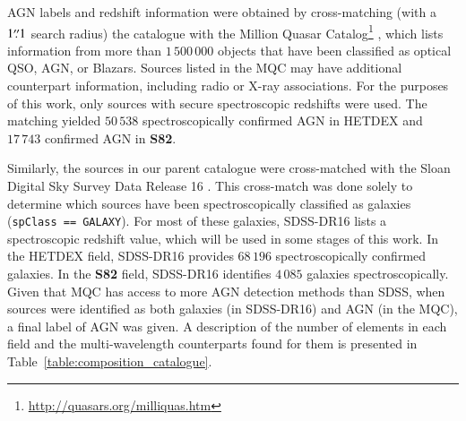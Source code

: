 \documentclass{aa}
\begin{document}
AGN labels and redshift information were obtained by cross-matching (with a $1\overset{\prime\prime}{.} 1$ search radius) the catalogue with the Million Quasar Catalog\footnote{\url{http://quasars.org/milliquas.htm}} \citep[MQC, v7.4d;][]{2021arXiv210512985F}, which lists information from more than $1\,500\,000$ objects that have been classified as optical QSO, AGN, or Blazars. Sources listed in the MQC may have additional counterpart information, including radio or X-ray associations. For the purposes of this work, only sources with secure spectroscopic redshifts were used. The matching yielded $50\,538$ spectroscopically confirmed AGN in HETDEX and $17\,743$ confirmed AGN in \textbf{S82}.

Similarly, the sources in our parent catalogue were cross-matched with the Sloan Digital Sky Survey Data Release 16 \citep[SDSS-DR16;][]{2020ApJS..249....3A}. This cross-match was done solely to determine which sources have been spectroscopically classified as galaxies (\verb|spClass == GALAXY|). 
For most of these galaxies, SDSS-DR16 lists a spectroscopic redshift value, which will be used in some stages of this work. In the HETDEX field, SDSS-DR16 provides $68\,196$ spectroscopically confirmed galaxies. In the \textbf{S82} field, SDSS-DR16 identifies $4\,085$ galaxies spectroscopically. Given that MQC has access to more AGN detection methods than SDSS, when sources were identified as both galaxies (in SDSS-DR16) and AGN (in the MQC), a final label of AGN was given. 
A description of the number of elements in each field and the multi-wavelength counterparts found for them is presented in Table~\ref{table:composition_catalogue}.
\end{document}
